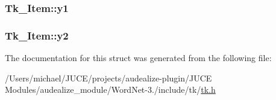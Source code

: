 \subsubsection[{\texorpdfstring{y1}{y1}}]{ Tk\+\_\+\+Item\+::y1}\hypertarget{struct_tk___item_a019374f8a73a4f99e56dcb989bd75c1e}{}\label{struct_tk___item_a019374f8a73a4f99e56dcb989bd75c1e}
\subsubsection[{\texorpdfstring{y2}{y2}}]{ Tk\+\_\+\+Item\+::y2}\hypertarget{struct_tk___item_a5b7fb153dc7ecb1f394e2f5192884865}{}\label{struct_tk___item_a5b7fb153dc7ecb1f394e2f5192884865}


The documentation for this struct was generated from the following file\+:\begin{DoxyCompactItemize}
\item 
/\+Users/michael/\+J\+U\+C\+E/projects/audealize-\/plugin/\+J\+U\+C\+E Modules/audealize\+\_\+module/\+Word\+Net-\/3./include/tk/\hyperlink{tk_8h}{tk.\+h}\end{DoxyCompactItemize}
